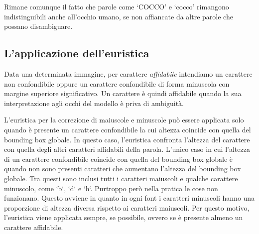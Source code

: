 Rimane comunque il fatto che parole come `COCCO' e `cocco' rimangono indistinguibili anche all'occhio umano, se non affiancate da altre parole che possano disambiguare.

\subsection{L'applicazione dell'euristica}

Data una determinata immagine, per carattere \emph{affidabile} intendiamo un carattere non confondibile oppure un carattere confondibile di forma minuscola con margine superiore significativo. Un carattere è quindi affidabile quando la sua interpretazione agli occhi del modello è priva di ambiguità.

L'euristica per la correzione di maiuscole e minuscole può essere applicata solo quando è presente un carattere confondibile la cui altezza coincide con quella del bounding box globale. In questo caso, l'euristica confronta l'altezza del carattere con quella degli altri caratteri affidabili della parola.
L'unico caso in cui l'altezza di un carattere confondibile coincide con quella del bounding box globale è quando non sono presenti caratteri che aumentano l'altezza del bounding box globale. Tra questi sono inclusi tutti i caratteri maiuscoli e qualche carattere minuscolo, come `b`, `d` e `h`.
Purtroppo però nella pratica le cose non funzionano. Questo avviene in quanto in ogni font i caratteri minuscoli hanno una proporzione di altezza diversa rispetto ai caratteri maiuscoli. Per questo motivo, l'euristica viene applicata sempre, se possibile, ovvero se è presente almeno un carattere affidabile.
